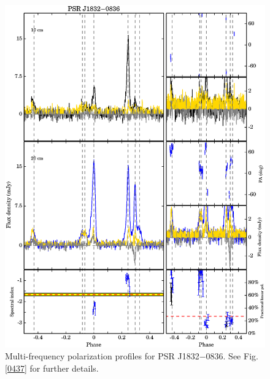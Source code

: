 \documentclass[useAMS,usenatbib]{mn2e}
\begin{document}
\begin{appendices}
\begin{figure}
\begin{center}
\includegraphics[width=6 in]{1832.ps}
\caption{Multi-frequency polarization profiles for PSR J1832$-$0836. 
See Fig. \ref{0437} for further details.}
\label{1832}
\end{center}
\end{figure}


\end{appendices}
\end{document}
